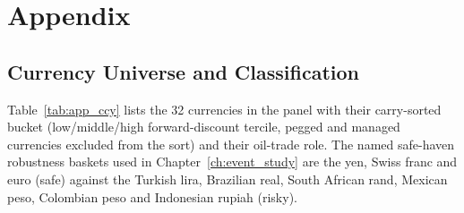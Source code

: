 
\chapter{Appendix}
\label{ch:appendix_a}

\section{Currency Universe and Classification}
\label{sec:app_classification}

Table~\ref{tab:app_ccy} lists the 32 currencies in the panel with their carry-sorted bucket
(low/middle/high forward-discount tercile, pegged and managed currencies excluded from the
sort) and their oil-trade role. The named safe-haven robustness baskets used in
Chapter~\ref{ch:event_study} are the yen, Swiss franc and euro (safe) against the Turkish
lira, Brazilian real, South African rand, Mexican peso, Colombian peso and Indonesian rupiah
(risky).

